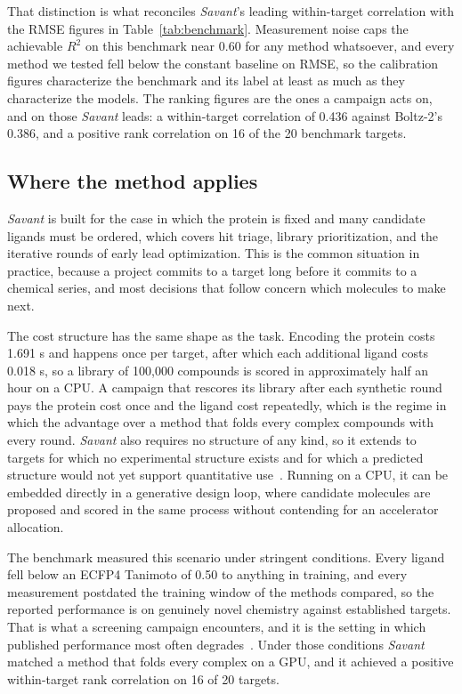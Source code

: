 \documentclass[times, twoside]{zHenriquesLab-StyleBioRxiv}
\newcommand{\savant}{\textit{Savant}\xspace}
\begin{document}
That distinction is what reconciles \savant's leading within-target correlation with the RMSE figures in Table~\ref{tab:benchmark}. Measurement noise caps the achievable $R^2$ on this benchmark near 0.60 for any method whatsoever, and every method we tested fell below the constant baseline on RMSE, so the calibration figures characterize the benchmark and its label at least as much as they characterize the models. The ranking figures are the ones a campaign acts on, and on those \savant leads: a within-target correlation of 0.436 against Boltz-2's 0.386, and a positive rank correlation on 16 of the 20 benchmark targets.

\subsection*{Where the method applies}

\savant is built for the case in which the protein is fixed and many candidate ligands must be ordered, which covers hit triage, library prioritization, and the iterative rounds of early lead optimization. This is the common situation in practice, because a project commits to a target long before it commits to a chemical series, and most decisions that follow concern which molecules to make next.

The cost structure has the same shape as the task. Encoding the protein costs 1.691 s and happens once per target, after which each additional ligand costs 0.018 s, so a library of 100,000 compounds is scored in approximately half an hour on a CPU. A campaign that rescores its library after each synthetic round pays the protein cost once and the ligand cost repeatedly, which is the regime in which the advantage over a method that folds every complex compounds with every round. \savant also requires no structure of any kind, so it extends to targets for which no experimental structure exists and for which a predicted structure would not yet support quantitative use~\cite{karelina2023alphafold}. Running on a CPU, it can be embedded directly in a generative design loop, where candidate molecules are proposed and scored in the same process without contending for an accelerator allocation.

The benchmark measured this scenario under stringent conditions. Every ligand fell below an ECFP4 Tanimoto of 0.50 to anything in training, and every measurement postdated the training window of the methods compared, so the reported performance is on genuinely novel chemistry against established targets. That is what a screening campaign encounters, and it is the setting in which published performance most often degrades~\cite{sheridan2013timesplit,wallach2018memorization}. Under those conditions \savant matched a method that folds every complex on a GPU, and it achieved a positive within-target rank correlation on 16 of 20 targets.
\end{document}
